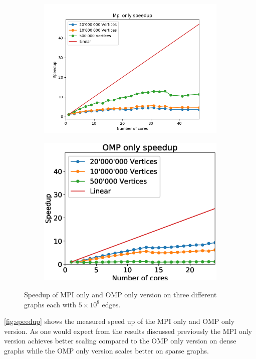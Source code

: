 
\begin{figure}
\begin{subfigure}[c]{0.23\textwidth}
\includegraphics[width=\textwidth]{plots/mpi_speedup_with_ref}
\label{fig:speedup_mpi}
\end{subfigure}
\begin{subfigure}[c]{0.23\textwidth}
\includegraphics[width=\textwidth]{plots/omp_speedup_with_ref}
\label{fig:speedup_omp}
\end{subfigure}
\caption{Speedup of MPI only and OMP only version on three different graphs each with
$5\times10^{8}$ edges.}
\label{fig:speedup}
\end{figure}

\autoref{fig:speedup} shows the measured speed up of the MPI only and OMP only version. As one
would expect from the results discussed previously the MPI only version achieves better scaling
compared to the OMP only version on dense graphs while the OMP only version scales better on sparse
graphs.


